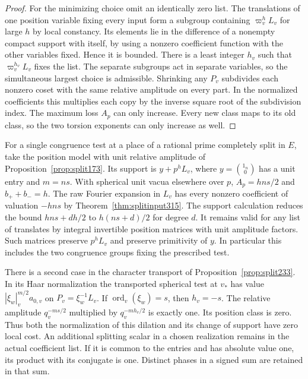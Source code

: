 \documentclass[a4paper,11pt]{article}
\theoremstyle{definition}
\theoremstyle{remark}
\numberwithin{equation}{section}
\begin{document}
\begin{proof}
For the minimizing choice omit an identically zero list.
The translations of one position variable fixing every input
form a subgroup containing \(\varpi_v^hL_v\) for large \(h\)
by local constancy. Its elements lie in the difference of a
nonempty compact support with itself, by using a nonzero
coefficient function with the other variables fixed. Hence it
is bounded. There is a least integer \(h_v\) such that
\(\varpi_v^{h_v}L_v\) fixes the list. The separate subgroups
act in separate variables, so the simultaneous largest choice
is admissible. Shrinking any \(P_v\) subdivides each nonzero
coset with the same relative amplitude on every part. In the
normalized coefficients this multiplies each copy by the inverse
square root of the subdivision index. The maximum loss \(A_p\)
can only increase. Every new class maps to its old class, so
the two torsion exponents can only increase as well.
\end{proof}

For a single congruence test at a place of a rational prime
completely split in \(E\), take the position model with unit
relative amplitude of Proposition~\ref{prop:split173}. Its
support is \(y+p^hL_v\), where \(y=\binom{1_n}{0}\) has a unit
entry and \(m=ns\). With spherical unit vacua elsewhere over
\(p\), \(A_p=hns/2\) and \(b_++b_-=h\). The raw Fourier
expansion in \(L_v\) has every nonzero coefficient of valuation
\(-hns\) by Theorem~\ref{thm:splitinput315}. The support
calculation reduces the bound \(hns+dh/2\) to \(h(ns+d)/2\)
for degree \(d\). It remains valid for any list of translates
by integral invertible position matrices with unit amplitude
factors. Such matrices preserve \(p^hL_v\) and preserve
primitivity of \(y\). In particular this includes the two
congruence groups fixing the prescribed test.

There is a second case in the character transport of
Proposition~\ref{prop:split233}. In its Haar normalization
the transported spherical test at \(v_*\) has value
\(|\xi_w|_v^{m/2}a_{0,v}\) on
\(P_v=\xi_w^{-1}L_v\). If \(\operatorname{ord}_v(\xi_w)=s\),
then \(h_v=-s\). The relative amplitude \(q_v^{-ms/2}\)
multiplied by \(q_v^{-m h_v/2}\) is exactly one. Its position
class is zero. Thus both the normalization of this dilation
and its change of support have zero local cost. An additional
splitting scalar in a chosen realization remains in the actual
coefficient list. If it is common to the entries and has absolute
value one, its product with its conjugate is one. Distinct
phases in a signed sum are retained in that sum.
\end{document}
